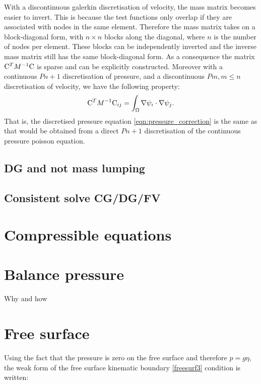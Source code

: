 With a discontinuous galerkin discretisation of velocity, the mass matrix
becomes easier to invert. This is because the test functions only overlap
if they are associated with nodes in the same element. Therefore the mass
matrix takes on a block-diagonal form, with $n\times n$ blocks along 
the diagonal, where $n$ is the number of nodes per element. These blocks
can be independently inverted and the inverse mass matrix still has the 
same block-diagonal form. As a consequence the matrix 
$\mathrm{C}^T M^{-1} \mathrm{C}$ is sparse and can be explicitly 
constructed. Moreover with a continuous $Pn+1$ discretisation of pressure,
and a discontinuous $Pm, m\leq n$ discretisation of velocity, we 
have the following property\citep{cotter2009}:
\begin{equation*}
  \mathrm{C}^T M^{-1} \mathrm{C}_{ij}=\int_\Omega \nabla \psi_i\cdot\nabla \psi_j.
\end{equation*}
That is, the discretised pressure equation \eqref{eqn:pressure_correction}
is the same as that would be obtained from a direct $Pn+1$ 
discretisation of the continuous pressure poisson equation.

\subsection{DG and not mass lumping}

\subsection{Consistent solve CG/DG/FV}

\section{Compressible equations}

\section{Balance pressure}
\label{Sect:balance_pressure}
Why and how

\section{Free surface}

Using the fact that the pressure is zero on the free surface and therefore $p=g\eta$, the weak form of the free surface kinematic boundary \eqref{freesurf3} condition is written:

